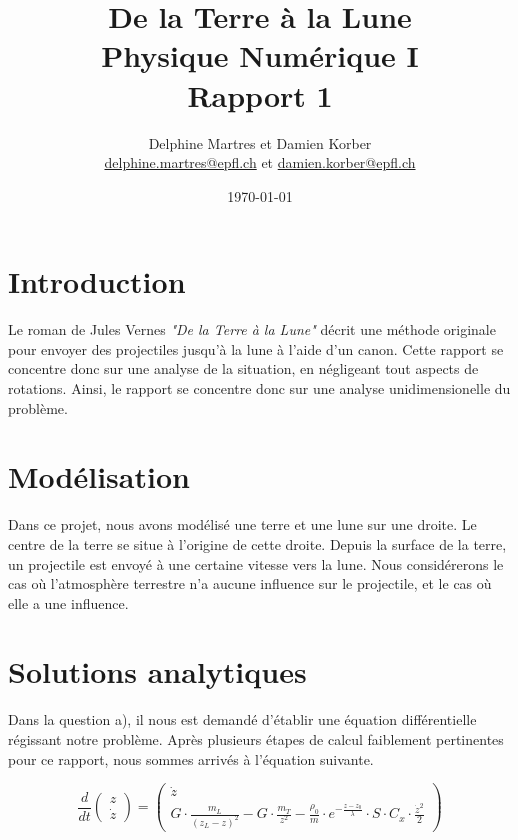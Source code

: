 \documentclass[a4paper,12pt,twoside]{article}
\newcommand{\mail}[1]{{\href{mailto:#1}{#1}}}
\begin{document}
\title{De la Terre à la Lune\\{\small Physique Numérique I}\\{\small Rapport 1}}
\date{\today}
\author{Delphine Martres et Damien Korber\\{\small \mail{delphine.martres@epfl.ch} et \mail{damien.korber@epfl.ch}}}
\maketitle
\tableofcontents %

\baselineskip=16pt
\parindent=15pt
\parskip=5pt




\section{Introduction}
Le roman de Jules Vernes \textit{"De la Terre à la Lune"} décrit une méthode originale pour envoyer des projectiles jusqu'à la lune à l'aide d'un canon. Cette rapport se concentre donc sur une analyse de la situation, en négligeant tout aspects de rotations. Ainsi, le rapport se concentre donc sur une analyse unidimensionelle du problème.

\section{Modélisation}
Dans ce projet, nous avons modélisé une terre et une lune sur une droite. Le centre de la terre se situe à l'origine de cette droite. Depuis la surface de la terre, un projectile est envoyé à une certaine vitesse vers la lune. Nous considérerons le cas où l'atmosphère terrestre n'a aucune influence sur le projectile, et le cas où elle a une influence.

\section{Solutions analytiques}
Dans la question a), il nous est demandé d'établir une équation différentielle régissant notre problème. Après plusieurs étapes de calcul faiblement pertinentes pour ce rapport, nous sommes arrivés à l'équation suivante.

\begin{equation}
    \frac{d}{dt}
    \begin{pmatrix}
        z \\
        \dot{z}
    \end{pmatrix}
    =
    \begin{pmatrix}
    \dot{z} \\
    G\cdot\frac{m_L}{(z_L - z)^2} - G\cdot\frac{m_T}{z^2} - \frac{\rho_0}{m}\cdot e^{-\frac{z-z_0}{\lambda}}\cdot S\cdot C_x\cdot \frac{\dot{z}^2}{2}
    \end{pmatrix}
    \label{eq:sol}
\end{equation}
\end{document}

